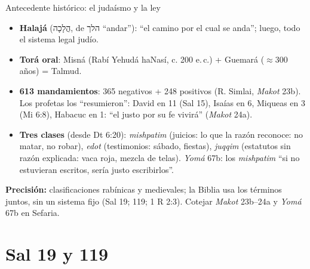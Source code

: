 \documentclass[hyperref={bookmarks=false},aspectratio=169]{beamer}
\newcommand{\heb}[1]{\mbox{\foreignlanguage{hebrew}{#1}}}
\newcommand{\precision}[1]{{\footnotesize\color{gris}\textbf{Precisión:} #1}}
\begin{document}
\begin{frame}{Antecedente histórico: el judaísmo y la ley}
\begin{tcolorbox}[colback=dorado!10,colframe=dorado!85!azul,boxrule=0.6pt,arc=2pt,fontupper=\scriptsize,title={\scriptsize No es la justicia de Dios declarada en la Biblia: es cómo la tradición posterior organizó la ley},coltitle=azuloscuro,colbacktitle=dorado!30]
\begin{itemize}\setlength{\itemsep}{1pt}
\item \textbf{Halajá} (\heb{הֲלָכָה}, de \heb{הלך} ``andar''): ``el camino por el cual se anda''; luego, todo el sistema legal judío.
\item \textbf{Torá oral}: Misná (Rabí Yehudá haNasí, c. 200 e.\,c.) + Guemará ($\approx$300 años) = Talmud.
\item \textbf{613 mandamientos}: 365 negativos + 248 positivos (R. Simlai, \emph{Makot} 23b). Los profetas los ``resumieron'': David en 11 (Sal 15), Isaías en 6, Miqueas en 3 (Mi 6:8), Habacuc en 1: ``el justo por su fe vivirá'' (\emph{Makot} 24a).
\item \textbf{Tres clases} (desde Dt 6:20): \emph{mishpatim} (juicios: lo que la razón reconoce: no matar, no robar), \emph{edot} (testimonios: sábado, fiestas), \emph{juqqim} (estatutos sin razón explicada: vaca roja, mezcla de telas). \emph{Yomá} 67b: los \emph{mishpatim} ``si no estuvieran escritos, sería justo escribirlos''.
\end{itemize}
\end{tcolorbox}
\precision{clasificaciones rabínicas y medievales; la Biblia usa los términos juntos, sin un sistema fijo (Sal 19; 119; 1 R 2:3). Cotejar \emph{Makot} 23b--24a y \emph{Yomá} 67b en Sefaria.}
\end{frame}

\section{Sal 19 y 119}
\end{document}
